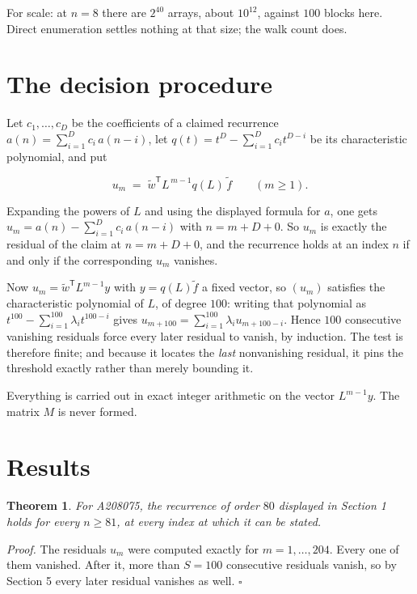 \documentclass[11pt]{article}
\newtheorem{theorem}{Theorem}
\theoremstyle{definition}
\begin{document}
For scale: at $n = 8$ there are $2^{40}$ arrays, about $10^{12}$, against $100$ blocks here. Direct enumeration settles nothing at that size; the walk count does.

\section{The decision procedure}

Let $c_1,\dots,c_D$ be the coefficients of a claimed recurrence $a(n) = \sum_{i=1}^{D} c_i\,a(n-i)$, let $q(t) = t^{D} - \sum_{i=1}^{D} c_i t^{D-i}$ be its characteristic polynomial, and put

\[u_m \;=\; \tilde w^{\mathsf T} L^{\,m-1} q(L)\,\tilde f \qquad (m \ge 1).\]

Expanding the powers of $L$ and using the displayed formula for $a$, one gets $u_m = a(n) - \sum_{i=1}^{D} c_i\,a(n-i)$ with $n = m + D + 0$. So $u_m$ is exactly the residual of the claim at $n = m + D + 0$, and the recurrence holds at an index $n$ if and only if the corresponding $u_m$ vanishes.

Now $u_m = \tilde w^{\mathsf T} L^{m-1} y$ with $y = q(L)\tilde f$ a fixed vector, so $(u_m)$ satisfies the characteristic polynomial of $L$, of degree $100$: writing that polynomial as $t^{100} - \sum_{i=1}^{100} \lambda_i t^{100-i}$ gives $u_{m+100} = \sum_{i=1}^{100} \lambda_i u_{m+100-i}$. Hence $100$ consecutive vanishing residuals force every later residual to vanish, by induction. The test is therefore finite; and because it locates the {\itshape last} nonvanishing residual, it pins the threshold exactly rather than merely bounding it.

Everything is carried out in exact integer arithmetic on the vector $L^{m-1}y$. The matrix $M$ is never formed.

\section{Results}

\begin{theorem} For A208075, the recurrence of order $80$ displayed in Section 1 holds for every $n \ge 81$, at every index at which it can be stated.\end{theorem}

{\itshape Proof.} The residuals $u_m$ were computed exactly for $m = 1,\dots,204$. Every one of them vanished. After it, more than $S = 100$ consecutive residuals vanish, so by Section 5 every later residual vanishes as well. $\square$
\end{document}

